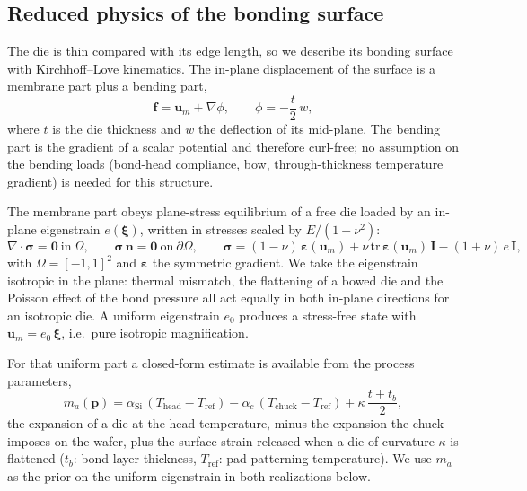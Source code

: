 \documentclass[11pt]{article}
\begin{document}
\subsection{Reduced physics of the bonding surface}\label{sec:reduced}
The die is thin compared with its edge length, so we describe its bonding surface with Kirchhoff--Love kinematics. The
in-plane displacement of the surface is a membrane part plus a bending part,
\begin{equation}\label{eq:kl}
  \mathbf{f} = \mathbf{u}_m + \nabla\phi, \qquad \phi = -\frac{t}{2}\,w ,
\end{equation}
where $t$ is the die thickness and $w$ the deflection of its mid-plane. The bending part is the gradient of a scalar
potential and therefore curl-free; no assumption on the bending loads (bond-head compliance, bow, through-thickness
temperature gradient) is needed for this structure.

The membrane part obeys plane-stress equilibrium of a free die loaded by an in-plane eigenstrain $e(\boldsymbol\xi)$,
written in stresses scaled by $E/(1-\nu^2)$:
\begin{equation}\label{eq:membrane}
  \nabla\cdot\boldsymbol\sigma = \mathbf{0}\ \text{in}\ \Omega,\qquad
  \boldsymbol\sigma\,\mathbf{n} = \mathbf{0}\ \text{on}\ \partial\Omega,\qquad
  \boldsymbol\sigma = (1-\nu)\,\boldsymbol\varepsilon(\mathbf{u}_m)
     + \nu\,\mathrm{tr}\,\boldsymbol\varepsilon(\mathbf{u}_m)\,\mathbf{I} - (1+\nu)\,e\,\mathbf{I},
\end{equation}
with $\Omega=[-1,1]^2$ and $\boldsymbol\varepsilon$ the symmetric gradient. We take the eigenstrain isotropic in the
plane: thermal mismatch, the flattening of a bowed die and the Poisson effect of the bond pressure all act equally in
both in-plane directions for an isotropic die. A uniform eigenstrain $e_0$ produces a stress-free state with
$\mathbf{u}_m=e_0\,\boldsymbol\xi$, i.e.\ pure isotropic magnification.

For that uniform part a closed-form estimate is available from the process parameters,
\begin{equation}\label{eq:prior}
  m_a(\mathbf{p}) = \alpha_{\mathrm{Si}}\,(T_{\mathrm{head}}-T_{\mathrm{ref}})
                  - \alpha_{c}\,(T_{\mathrm{chuck}}-T_{\mathrm{ref}})
                  + \kappa\,\frac{t+t_{b}}{2},
\end{equation}
the expansion of a die at the head temperature, minus the expansion the chuck imposes on the wafer, plus the surface
strain released when a die of curvature $\kappa$ is flattened ($t_b$: bond-layer thickness, $T_{\mathrm{ref}}$: pad
patterning temperature). We use $m_a$ as the prior on the uniform eigenstrain in both realizations below.
\end{document}
